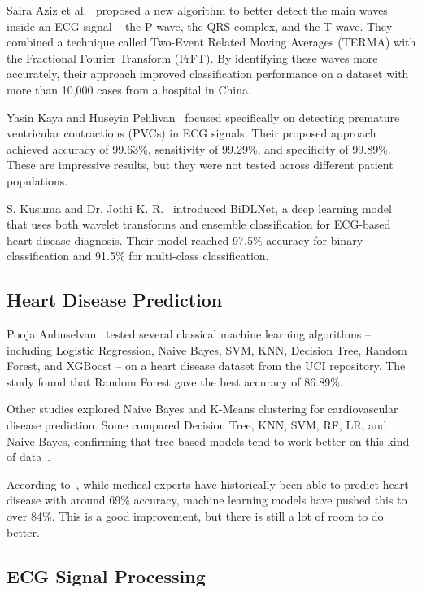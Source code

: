 \documentclass[10pt, twocolumn]{article}
\begin{document}
Saira Aziz et al.~\cite{aziz2021} proposed a new algorithm to better detect the main waves
inside an ECG signal -- the P wave, the QRS complex, and the T wave. They combined a technique
called Two-Event Related Moving Averages (TERMA) with the Fractional Fourier Transform (FrFT).
By identifying these waves more accurately, their approach improved classification performance
on a dataset with more than 10,000 cases from a hospital in China.

Yasin Kaya and Huseyin Pehlivan~\cite{kaya2015} focused specifically on detecting premature
ventricular contractions (PVCs) in ECG signals. Their proposed approach achieved accuracy of
99.63\%, sensitivity of 99.29\%, and specificity of 99.89\%. These are impressive results,
but they were not tested across different patient populations.

S. Kusuma and Dr. Jothi K. R.~\cite{kusuma2022} introduced BiDLNet, a deep learning model
that uses both wavelet transforms and ensemble classification for ECG-based heart disease
diagnosis. Their model reached 97.5\% accuracy for binary classification and 91.5\% for
multi-class classification.

\subsection{Heart Disease Prediction}

Pooja Anbuselvan~\cite{anbuselvan2020} tested several classical machine learning algorithms --
including Logistic Regression, Naive Bayes, SVM, KNN, Decision Tree, Random Forest, and
XGBoost -- on a heart disease dataset from the UCI repository. The study found that Random
Forest gave the best accuracy of 86.89\%.

Other studies explored Naive Bayes and K-Means clustering for cardiovascular disease
prediction. Some compared Decision Tree, KNN, SVM, RF, LR, and Naive Bayes, confirming that
tree-based models tend to work better on this kind of data~\cite{ramalingam2018}.

According to~\cite{iqbal2022}, while medical experts have historically been able to predict
heart disease with around 69\% accuracy, machine learning models have pushed this to over 84\%.
This is a good improvement, but there is still a lot of room to do better.

\subsection{ECG Signal Processing}
\end{document}

